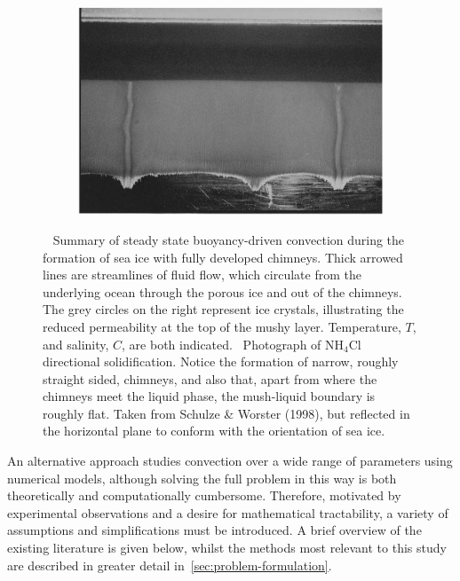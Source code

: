 \documentclass[11pt,twocolumn]{article}
\begin{document}
\begin{figure}[t]
\begin{subfigure}[t]{.55\linewidth}
    \label{subfig:convection-in-sea-ice}
\end{subfigure}
\quad
\captionsetup[subfigure]{ aboveskip=4pt}
\begin{subfigure}[t]{.36\linewidth}
   \centering
   \caption{}
    \includegraphics[width=0.9\linewidth, right]{mushy-layer-chimneys-photo-schulze-worster.jpg}
    
    \label{subfig:schulze-worster-photo}
\end{subfigure}

\caption{~ Summary of steady state buoyancy-driven convection during the formation of sea ice with fully developed chimneys. Thick arrowed lines are streamlines of fluid flow, which circulate from the underlying ocean through the porous ice and out of the chimneys. The grey circles on the right represent ice crystals, illustrating the reduced permeability at the top of the mushy layer. Temperature, $T$, and salinity, $C$, are both indicated.~ Photograph of $\textrm{NH}_4\textrm{Cl}$ directional solidification. Notice the formation of narrow, roughly straight sided, chimneys, and also that, apart from where the chimneys meet the liquid phase, the mush-liquid boundary is roughly flat. Taken from Schulze \& Worster (1998), but reflected in the horizontal plane to conform with the orientation of sea ice.}

\setlength{\belowcaptionskip}{0pt} %

 \label{fig:overview-diagram-photo}

\end{figure}


An alternative approach studies convection over a wide range of parameters using numerical models, although solving the full problem in this way is both theoretically and computationally cumbersome. Therefore, motivated by experimental observations and a desire for mathematical tractability, a variety of assumptions and simplifications must be introduced. A brief overview of the existing literature is given below, whilst the methods most relevant to this study are described in greater detail in~\autoref{sec:problem-formulation}.
\end{document}
